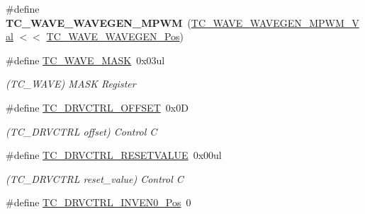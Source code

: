 \begin{DoxyCompactItemize}
\item 
\hypertarget{group___s_a_m_l21___t_c_ga7b4678ea744433410d6ecbae950d160b}{}\#define {\bfseries T\+C\+\_\+\+W\+A\+V\+E\+\_\+\+W\+A\+V\+E\+G\+E\+N\+\_\+\+M\+P\+W\+M}~(\hyperlink{group___s_a_m_l21___t_c_ga2d4ea75e30a84486be5cd5b49322b652}{T\+C\+\_\+\+W\+A\+V\+E\+\_\+\+W\+A\+V\+E\+G\+E\+N\+\_\+\+M\+P\+W\+M\+\_\+\+Val}      $<$$<$ \hyperlink{group___s_a_m_l21___t_c_gabc51dddbbf88d5c313cb3ec2f41ce8d4}{T\+C\+\_\+\+W\+A\+V\+E\+\_\+\+W\+A\+V\+E\+G\+E\+N\+\_\+\+Pos})\label{group___s_a_m_l21___t_c_ga7b4678ea744433410d6ecbae950d160b}

\item 
\hypertarget{group___s_a_m_l21___t_c_ga5ee73efd37f9a1d450f87b239be9c27d}{}\#define \hyperlink{group___s_a_m_l21___t_c_ga5ee73efd37f9a1d450f87b239be9c27d}{T\+C\+\_\+\+W\+A\+V\+E\+\_\+\+M\+A\+S\+K}~0x03ul\label{group___s_a_m_l21___t_c_ga5ee73efd37f9a1d450f87b239be9c27d}

\begin{DoxyCompactList}\small\item\em (T\+C\+\_\+\+W\+A\+V\+E) M\+A\+S\+K Register \end{DoxyCompactList}\item 
\hypertarget{group___s_a_m_l21___t_c_ga006e928b923d335386d18a855e599005}{}\#define \hyperlink{group___s_a_m_l21___t_c_ga006e928b923d335386d18a855e599005}{T\+C\+\_\+\+D\+R\+V\+C\+T\+R\+L\+\_\+\+O\+F\+F\+S\+E\+T}~0x0\+D\label{group___s_a_m_l21___t_c_ga006e928b923d335386d18a855e599005}

\begin{DoxyCompactList}\small\item\em (T\+C\+\_\+\+D\+R\+V\+C\+T\+R\+L offset) Control C \end{DoxyCompactList}\item 
\hypertarget{group___s_a_m_l21___t_c_ga525cdd2b2c51c7206efa89c3332e3dc5}{}\#define \hyperlink{group___s_a_m_l21___t_c_ga525cdd2b2c51c7206efa89c3332e3dc5}{T\+C\+\_\+\+D\+R\+V\+C\+T\+R\+L\+\_\+\+R\+E\+S\+E\+T\+V\+A\+L\+U\+E}~0x00ul\label{group___s_a_m_l21___t_c_ga525cdd2b2c51c7206efa89c3332e3dc5}

\begin{DoxyCompactList}\small\item\em (T\+C\+\_\+\+D\+R\+V\+C\+T\+R\+L reset\+\_\+value) Control C \end{DoxyCompactList}\item 
\hypertarget{group___s_a_m_l21___t_c_gaa165efb4190a3164d2d51d1670e977b9}{}\#define \hyperlink{group___s_a_m_l21___t_c_gaa165efb4190a3164d2d51d1670e977b9}{T\+C\+\_\+\+D\+R\+V\+C\+T\+R\+L\+\_\+\+I\+N\+V\+E\+N0\+\_\+\+Pos}~0\label{group___s_a_m_l21___t_c_gaa165efb4190a3164d2d51d1670e977b9}


\end{DoxyCompactItemize}
